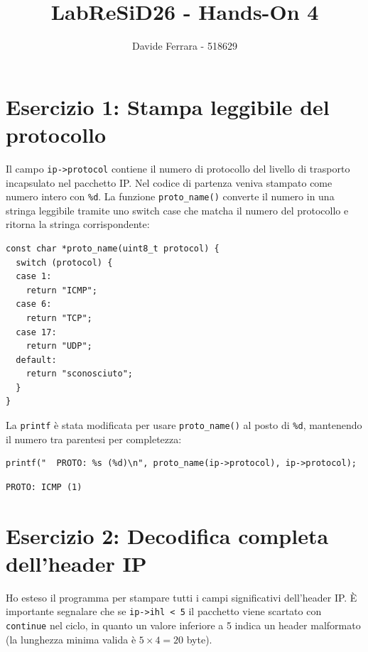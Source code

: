 \documentclass[a4paper,12pt]{article}
\title{LabReSiD26 - Hands-On 4}
\author{Davide Ferrara - 518629}
\date{}
\begin{document}
\maketitle

\section{Esercizio 1: Stampa leggibile del protocollo}

Il campo \texttt{ip->protocol} contiene il numero di protocollo del livello di trasporto
incapsulato nel pacchetto IP. Nel codice di partenza veniva stampato come numero intero
con \texttt{\%d}. La funzione \texttt{proto\_name()} converte il numero in una stringa
leggibile tramite uno switch case che matcha il numero del protocollo e ritorna la stringa
corrispondente:

\begin{lstlisting}[caption={proto\_name() -- implementazione}]
const char *proto_name(uint8_t protocol) {
  switch (protocol) {
  case 1:
    return "ICMP";
  case 6:
    return "TCP";
  case 17:
    return "UDP";
  default:
    return "sconosciuto";
  }
}
\end{lstlisting}

La \texttt{printf} è stata modificata per usare \texttt{proto\_name()} al posto di
\texttt{\%d}, mantenendo il numero tra parentesi per completezza:

\begin{lstlisting}[caption={Uso nel loop di stampa}]
printf("  PROTO: %s (%d)\n", proto_name(ip->protocol), ip->protocol);
\end{lstlisting}

\begin{lstlisting}[language={}, caption={Output}]
  PROTO: ICMP (1)
\end{lstlisting}

\section{Esercizio 2: Decodifica completa dell'header IP}

Ho esteso il programma per stampare tutti i campi significativi dell'header IP.
È importante segnalare che se \texttt{ip->ihl < 5} il pacchetto viene scartato
con \texttt{continue} nel ciclo, in quanto un valore inferiore a 5 indica un
header malformato (la lunghezza minima valida è $5 \times 4 = 20$ byte).
\end{document}
